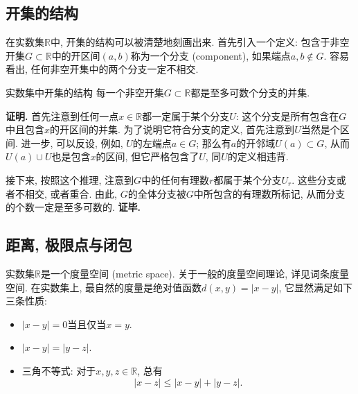\subsection{开集的结构}
在实数集$\mathbb{R}$中, 开集的结构可以被清楚地刻画出来. 首先引入一个定义: 包含于非空开集$G\subset\mathbb{R}$中的开区间$(a,b)$称为一个分支 (component), 如果端点$a,b\notin G$. 容易看出, 任何非空开集中的两个分支一定不相交.

\begin{theorem}{实数集中开集的结构}
每一个非空开集$G\subset\mathbb{R}$都是至多可数个分支的并集. 
\end{theorem}
\textbf{证明.} 首先注意到任何一点$x\in\mathbb{R}$都一定属于某个分支$U$: 这个分支是所有包含在$G$中且包含$x$的开区间的并集. 为了说明它符合分支的定义, 首先注意到$U$当然是个区间. 进一步, 可以反设, 例如, $U$的左端点$a\in G$; 那么有$a$的开邻域$U(a)\subset G$, 从而$U(a)\cup U$也是包含$x$的区间, 但它严格包含了$U$, 同$U$的定义相违背.

接下来, 按照这个推理, 注意到$G$中的任何有理数$r$都属于某个分支$U_r$. 这些分支或者不相交, 或者重合. 由此, $G$的全体分支被$G$中所包含的有理数所标记, 从而分支的个数一定是至多可数的. \textbf{证毕.}

\subsection{距离, 极限点与闭包}
实数集$\mathbb{R}$是一个度量空间 (metric space). 关于一般的度量空间理论, 详见词条度量空间. 在实数集上, 最自然的度量是绝对值函数$d(x,y)=|x-y|$, 它显然满足如下三条性质:

\begin{itemize}
\item $|x-y|=0$当且仅当$x=y$.
\item $|x-y|=|y-z|$.
\item 三角不等式: 对于$x,y,z\in\mathbb{R}$, 总有
$$
|x-z|\leq|x-y|+|y-z|.
$$
\end{itemize}
